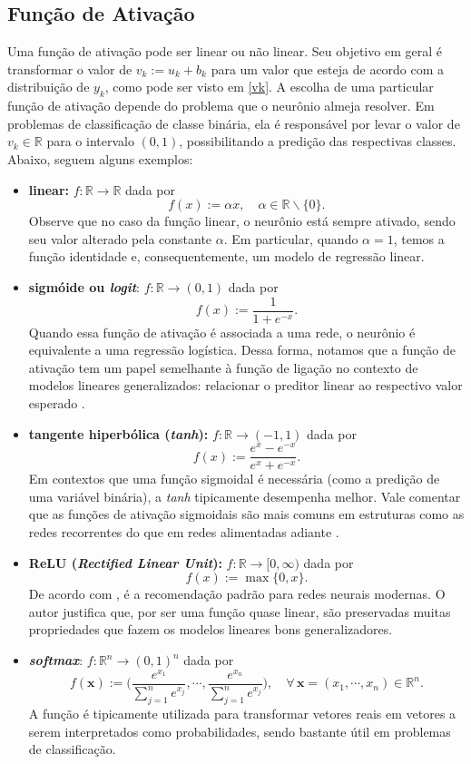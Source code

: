 \documentclass[twoside]{automatextcc}
\newcommand{\R}{\mathds{R}}
\newcommand{\bs}[1]{\boldsymbol{#1}}
\begin{document}
\subsection{Função de Ativação}
Uma função de ativação pode ser linear ou não linear. Seu objetivo em geral é transformar o valor de $v_k := u_k + b_k$ para um valor que esteja de acordo com a distribuição de $y_k$, como pode ser visto em \eqref{vk}. A escolha de uma particular função de ativação depende do problema que o neurônio almeja resolver. Em problemas de classificação de classe binária, ela é responsável por levar o valor de $v_k \in \R$ para o intervalo $(0,1)$, possibilitando a predição das respectivas classes. Abaixo, seguem alguns exemplos:
\begin{itemize}
    \item \textbf{linear:} $f: \R \rightarrow \R$ dada por 
    \[f(x) := \alpha x, \quad \alpha \in \R\backslash\{0\}.\]
    Observe que no caso da função linear, o neurônio está sempre ativado, sendo seu valor alterado pela constante $\alpha$. Em particular, quando $\alpha=1$, temos a função identidade e, consequentemente, um modelo de regressão linear.
    \item \textbf{sigmóide ou \textit{logit}}: $f: \R \rightarrow (0,1)$ dada por 
    \[f(x) := \frac{1}{1 + e^{-x}}.\]
    Quando essa função de ativação é associada a uma rede, o neurônio é equivalente a uma regressão logística. Dessa forma, notamos que a função de ativação tem um papel semelhante à função de ligação no contexto de modelos lineares generalizados: relacionar o preditor linear ao respectivo valor esperado \citep{mccullagh1989,sarle1994,frei2020}.
    \item \textbf{tangente hiperbólica (\textit{tanh}):}  $f:\R \rightarrow (-1,1)$ dada por 
    \[f(x) := \frac{e^{x}-e^{-x}}{e^{x}+e^{-x}}.\]
    Em contextos que uma função sigmoidal é necessária (como a predição de uma variável binária), a \textit{tanh} tipicamente desempenha melhor. Vale comentar que as funções de ativação sigmoidais são mais comuns em estruturas como as redes recorrentes do que em redes alimentadas adiante \citep{goodfellow2016}. 
    \item \textbf{ReLU (\textit{Rectified Linear Unit}):} $f: \R \rightarrow [0,\infty)$ dada por 
    \[f(x) := \max\{0,x\}.\]
    De acordo com \citet{goodfellow2016}, é a recomendação padrão para redes neurais modernas. O autor justifica que, por ser uma função quase linear, são preservadas muitas propriedades que fazem os modelos lineares bons generalizadores. 
    \item \textbf{\textit{softmax}}: $f:\R^n\rightarrow (0,1)^n$ dada por 
    \[f(\bs x):=\bigg(\frac{e^{x_1}}{\sum_{j=1}^n e^{x_j}},\cdots, \frac{e^{x_n}}{\sum_{j=1}^n e^{x_j}}\bigg), \quad \forall\,\bs x=(x_1,\cdots,x_n)\in\R^n.\]
    {A função} é tipicamente utilizada para transformar vetores reais em vetores a serem interpretados como probabilidades, sendo bastante útil em problemas de classificação.
\end{itemize}
\end{document}
